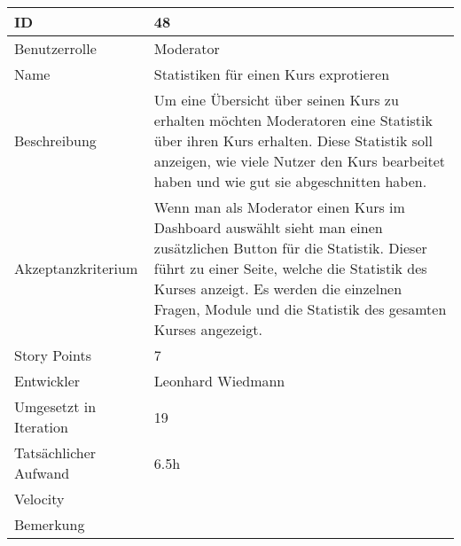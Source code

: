 \begin{tabularx}{\textwidth}{|p{}|X|}
	\hline
	ID & 48\\
	\hline
	Benutzerrolle & Moderator\\
	\hline
	Name & Statistiken für einen Kurs exprotieren\\
	\hline
	Beschreibung & Um eine Übersicht über seinen Kurs zu erhalten möchten Moderatoren eine Statistik über ihren Kurs erhalten. Diese Statistik soll anzeigen, wie viele Nutzer den Kurs bearbeitet haben und wie gut sie abgeschnitten haben.\\
	\hline
	Akzeptanzkriterium & Wenn man als Moderator einen Kurs im Dashboard auswählt sieht man einen zusätzlichen Button für die Statistik. Dieser führt zu einer Seite, welche die Statistik des Kurses anzeigt. Es werden die einzelnen Fragen, Module und die Statistik des gesamten Kurses angezeigt.\\
	\hline
	Story Points & 7\\
	\hline
	Entwickler & Leonhard Wiedmann\\
	\hline
	Umgesetzt in Iteration & 19\\
	\hline
	Tatsächlicher Aufwand & 6.5h \\
	\hline
	Velocity & \\
	\hline
	Bemerkung & \\
	\hline
\end{tabularx}
\vspace{20pt}
